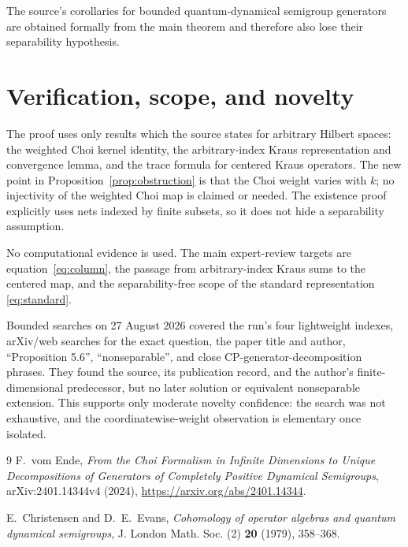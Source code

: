 \documentclass[11pt]{article}
\begin{document}
The source's corollaries for bounded quantum-dynamical semigroup generators
are obtained formally from the main theorem and therefore also lose their
separability hypothesis.

\section{Verification, scope, and novelty}

The proof uses only results which the source states for arbitrary Hilbert
spaces: the weighted Choi kernel identity, the arbitrary-index Kraus
representation and convergence lemma, and the trace formula for centered
Kraus operators.  The new point in Proposition~\ref{prop:obstruction} is that
the Choi weight varies with $k$; no injectivity of the weighted Choi map is
claimed or needed.  The existence proof explicitly uses nets indexed by
finite subsets, so it does not hide a separability assumption.

No computational evidence is used.  The main expert-review targets are
equation~\eqref{eq:column}, the passage from arbitrary-index Kraus sums to the
centered map, and the separability-free scope of the standard representation
\eqref{eq:standard}.

Bounded searches on 27 August 2026 covered the run's four lightweight indexes,
arXiv/web searches for the exact question, the paper title and author,
``Proposition 5.6'', ``nonseparable'', and close CP-generator-decomposition
phrases.  They found the source, its publication record, and the author's
finite-dimensional predecessor, but no later solution or equivalent
nonseparable extension.  This supports only moderate novelty confidence: the
search was not exhaustive, and the coordinatewise-weight observation is
elementary once isolated.

\begin{thebibliography}{9}
F.~vom Ende,
\emph{From the Choi Formalism in Infinite Dimensions to Unique
Decompositions of Generators of Completely Positive Dynamical Semigroups},
arXiv:2401.14344v4 (2024),
\url{https://arxiv.org/abs/2401.14344}.

E.~Christensen and D.~E.~Evans,
\emph{Cohomology of operator algebras and quantum dynamical semigroups},
J. London Math. Soc. (2) \textbf{20} (1979), 358--368.
\end{thebibliography}
\end{document}
